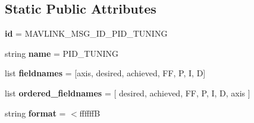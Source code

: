 \subsection*{Static Public Attributes}
\begin{DoxyCompactItemize}
\item 
\mbox{\label{classpymavlink_1_1dialects_1_1v10_1_1MAVLink__pid__tuning__message_a91297c8ba5407ebe9b9215540157dcd7}} 
{\bfseries id} = M\+A\+V\+L\+I\+N\+K\+\_\+\+M\+S\+G\+\_\+\+I\+D\+\_\+\+P\+I\+D\+\_\+\+T\+U\+N\+I\+NG
\item 
\mbox{\label{classpymavlink_1_1dialects_1_1v10_1_1MAVLink__pid__tuning__message_acd6305b01eab2e453e43717bd0296a0c}} 
string {\bfseries name} = \textquotesingle{}P\+I\+D\+\_\+\+T\+U\+N\+I\+NG\textquotesingle{}
\item 
\mbox{\label{classpymavlink_1_1dialects_1_1v10_1_1MAVLink__pid__tuning__message_a69606f0c2c35412686061dac597b7661}} 
list {\bfseries fieldnames} = \mbox{[}\textquotesingle{}axis\textquotesingle{}, \textquotesingle{}desired\textquotesingle{}, \textquotesingle{}achieved\textquotesingle{}, \textquotesingle{}FF\textquotesingle{}, \textquotesingle{}P\textquotesingle{}, \textquotesingle{}I\textquotesingle{}, \textquotesingle{}D\textquotesingle{}\mbox{]}
\item 
\mbox{\label{classpymavlink_1_1dialects_1_1v10_1_1MAVLink__pid__tuning__message_ac4710b50a062f707af247cc1babf4769}} 
list {\bfseries ordered\+\_\+fieldnames} = \mbox{[} \textquotesingle{}desired\textquotesingle{}, \textquotesingle{}achieved\textquotesingle{}, \textquotesingle{}FF\textquotesingle{}, \textquotesingle{}P\textquotesingle{}, \textquotesingle{}I\textquotesingle{}, \textquotesingle{}D\textquotesingle{}, \textquotesingle{}axis\textquotesingle{} \mbox{]}
\item 
\mbox{\label{classpymavlink_1_1dialects_1_1v10_1_1MAVLink__pid__tuning__message_afe59c0eb09428c0fceec8875471f25d6}} 
string {\bfseries format} = \textquotesingle{}$<$ffffffB\textquotesingle{}

\end{DoxyCompactItemize}
